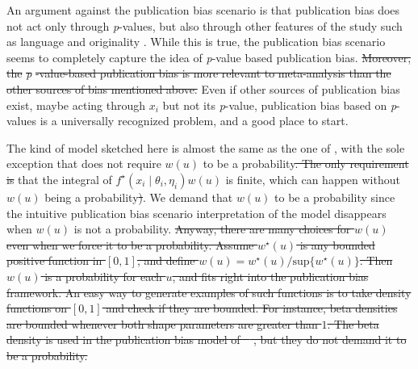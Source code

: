 \documentclass[useAMS,usenatbib,referee]{biom}
\providecommand{\DIFaddtex}[1]{{\protect\color{green}\uwave{#1}}} %
\providecommand{\DIFdeltex}[1]{{\protect\color{red}\sout{#1}}}                      %
\providecommand{\DIFaddbegin}{} %
\providecommand{\DIFaddend}{} %
\providecommand{\DIFdelbegin}{} %
\providecommand{\DIFdelend}{} %
\providecommand{\DIFadd}[1]{\texorpdfstring{\DIFaddtex{#1}}{#1}} %
\providecommand{\DIFdel}[1]{\texorpdfstring{\DIFdeltex{#1}}{}} %
\begin{document}
An argument against the publication bias scenario is that publication bias does not act only through \textit{p}-values, but also through other features of the study such as language \citep{egger1998meta}
and originality \citep{callaham1998positive}. While this is true, the publication bias scenario seems to completely capture the idea of \textit{p}-value based publication bias. \DIFdelbegin \DIFdel{Moreover, the }\textit{\DIFdel{p}}%
\DIFdel{-value-based publication bias is more relevant to meta-analysis than the other sources of bias mentioned above. }\DIFdelend Even if other sources of publication bias exist, maybe acting through $x_{i}$ but not its \textit{p}-value, publication bias based on \textit{p}-values is a universally recognized problem, and a good place to start.

The kind of model sketched here is almost the same as the one of \citet{hedges1992modeling}, with the sole exception that \citet{hedges1992modeling} does not require \DIFdelbegin \DIFdel{$w(u)$ }\DIFdelend \DIFaddbegin \DIFadd{$w(u_i)$ }\DIFaddend to be a probability\DIFdelbegin \DIFdel{. The only requirement is }\DIFdelend \DIFaddbegin \DIFadd{, just }\DIFaddend that the integral of \DIFdelbegin \DIFdel{$f^{\star}(x_{i}\mid\theta_{i},\eta_{i})w(u)$ }\DIFdelend \DIFaddbegin \DIFadd{$f^{\star}(x_{i}\mid\theta_{i},\eta_{i})w(u_i)$ }\DIFaddend is finite, which can happen without \DIFdelbegin \DIFdel{$w(u)$ }\DIFdelend \DIFaddbegin \DIFadd{$w(u_i)$ }\DIFaddend being a probability\DIFdelbegin \DIFdel{)}\DIFdelend . We demand that \DIFdelbegin \DIFdel{$w(u)$ }\DIFdelend \DIFaddbegin \DIFadd{$w(u_i)$ }\DIFaddend to be a probability since the intuitive publication bias scenario interpretation of the model disappears when \DIFdelbegin \DIFdel{$w(u)$ }\DIFdelend \DIFaddbegin \DIFadd{$w(u_i)$ }\DIFaddend is not a probability. \DIFdelbegin \DIFdel{Anyway, there are many choices for $w(u)$ even when we force it to be a probability. Assume $w^{\star}(u)$ is any bounded positive function in $\left[0,1\right]$, and define $w(u)=w^{\star}(u)/\textrm{sup}\{w^{\star}(u)\}$. Then $w(u)$ is a probability for each $u$, and fits right into the publication bias framework. An easy way to generate examples of such functions is to take density functions on $\left[0,1\right]$ and check if they are bounded. For instance, beta densities are bounded whenever both shape parameters are greater than $1$. The beta density is used in the publication bias model of \mbox{%
\citet{citkowicz2017parsimonious}}\hspace{0pt}%
, but they do not demand it to be a probability.
}\DIFdelend %
\end{document}
